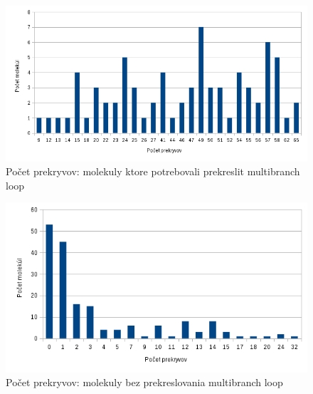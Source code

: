 \begin{figure}
  \includegraphics[width=1\textwidth]{../img/statistika/prekryvy-pocetmolekul-s-rotaciami}
  \caption{Počet prekryvov: molekuly ktore potrebovali prekreslit multibranch loop}
  \label{obr:statistika_prekryvy_bez_rotacii}
\end{figure}


\begin{figure}
  \includegraphics[width=1\textwidth]{../img/statistika/prekryvy-pocetmolekul-bez-rotacii}
  \caption{Počet prekryvov: molekuly bez prekreslovania multibranch loop}
  \label{obr:statistika_prekryvy_s_rotaciami}
\end{figure}

